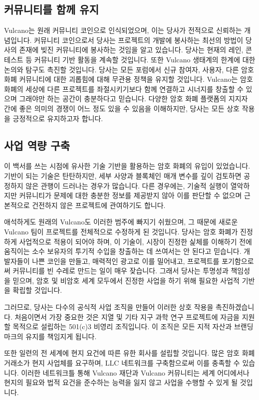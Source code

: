 \documentclass[A4paper, 12pt]{article}
\begin{document}
\subsection{커뮤니티를 함께 유지}
Vulcano는 원래 커뮤니티 코인으로 인식되었으며, 이는 당사가 전적으로 신뢰하는 개념입니다. 커뮤니티 코인으로서 당사는 프로젝트의 개발에 봉사하는 최선의 방법이 당사의 존재에 빚진 커뮤니티에 봉사하는 것임을 알고 있습니다. 당사는 현재의 레인, 콘테스트 등 커뮤니티 기반 활동을 계속할 것입니다. 또한 Vulcano 생태계의 한계에 대한 논의와 탐구도 촉진할 것입니다. 당사는 모든 포럼에서 신규 참여자, 사용자, 다른 암호 화폐 커뮤니티에 대한 괴롭힘에 대해 무관용 정책을 유지할 것입니다. Vulcano는 암호 화폐의 세상에 다른 프로젝트를 좌절시키기보다 함께 연결하고 시너지를 창출할 수 있으며 그래야만 하는 공간이 충분하다고 믿습니다. 다양한 암호 화폐 플랫폼의 지지자 간에 좋은 의미의 경쟁이 어느 정도 있을 수 있음을 이해하지만, 당사는 모든 상호 작용을 긍정적으로 유지하고자 합니다.

\subsection{사업 역량 구축}
이 백서를 쓰는 시점에 유사한 기술 기반을 활용하는 암호 화폐의 유입이 있었습니다. 기반이 되는 기술은 탄탄하지만, 세부 사양과 블록체인 매개 변수를 깊이 검토하면 공정하지 않은 관행이 드러나는 경우가 많습니다. 다른 경우에는, 기술적 실행이 열악하지만 커뮤니티가 문제에 대한 충분한 정보를 제공받지 않아 이를 판단할 수 없으며 근본적으로 건전하지 않은 프로젝트에 관여하기도 합니다.

애석하게도 원래의 Vulcano도 이러한 범주에 빠지기 쉬웠으며, 그 때문에 새로운 Vulcano 팀이 프로젝트를 전체적으로 수정하게 된 것입니다. 당사는 암호 화폐가 진정하게 사업적으로 적용이 되어야 하며, 이 기술이, 시장이 진정한 싩체를 이해하기 전에 움직이는 소수 보유자의 투기적 수입을 창출하는 데 쓰여서는 안 된다고 믿습니다. 개발자들이 나쁜 코인을 만들고, 매력적인 광고로 이를 밀어내고, 프로젝트를 포기함으로써 커뮤니티를 빈 수레로 만드는 일이 매우 잦습니다. 그래서 당사는 투명성과 책임성을 믿으며, 암호 및 비암호 세계 모두에서 진정한 사업을 하기 위해 필요한 사업적 기반을 확립할 것입니다. 

그러므로, 당사는 다수의 공식적 사업 조직을 만들어 이러한 상호 작용을 촉진하겠습니다. 처음이면서 가장 중요한 것은 지열 및 기타 지구 과학 연구 프로젝트에 자금을 지원할 목적으로 설립하는 501(c)3 비영리 조직입니다. 이 조직은 모든 지적 자산과 브랜딩 마크의 유지를 책임지게 됩니다.

또한 일련의 전 세계에 현지 요건에 따른 유한 회사를 설립할 것입니다. 많은 암호 화폐 거래소가 현지 사업체를 요구하며, LLC 네트워크를 구축함으로써 이를 충족할 수 있습니다. 이러한 네트워크틀 통해 Vulcano 재단과 Vulcano 커뮤니티는 세계 어디에서나 현지의 필요와 법적 요건을 준수하는 능력을 잃지 않고 사업을 수행할 수 있게 될 것입니다.
\end{document}
